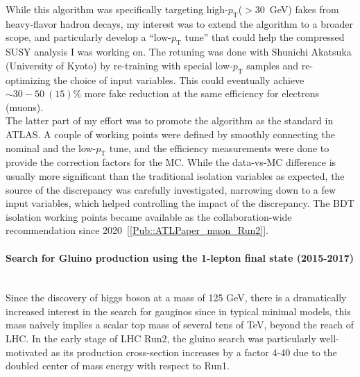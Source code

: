\documentclass[12pt]{article}
\newcommand{\Subsubsection}[1]{\subsubsection*{#1}
\addcontentsline{toc}{subsubsection}{#1}}
\newcommand{\pt}{\ensuremath{p_{\text{T}}}\xspace}
\begin{document}
While this algorithm was specifically targeting high-\pt ($>30$~GeV) fakes from heavy-flavor hadron decays,
my interest was to extend the algorithm to a broader scope, and particularly develop a ``low-\pt tune'' that could help the compressed SUSY analysis I was working on.
The retuning was done with Shunichi Akatsuka (University of Kyoto) by re-training with special low-\pt samples and re-optimizing the choice of input variables.
This could eventually achieve $\sim 30-50~(15)\%$ more fake reduction at the same efficiency for electrons (muons). \\

The latter part of my effort was to promote the algorithm as the standard in ATLAS.
A couple of working points were defined by smoothly connecting the nominal and the low-\pt tune, and the efficiency measurements were done to provide the correction factors for the MC.
While the data-vs-MC difference is usually more significant than the traditional isolation variables as expected, the source of the discrepancy was carefully investigated, narrowing down to a few input variables, which helped controlling the impact of the discrepancy.
The BDT isolation working points became available as the collaboration-wide recommendation since 2020~[\ref{Pub::ATLPaper_muon_Run2}].


\paragraph{Search for Gluino production using the 1-lepton final state (2015-2017)}  \phantom{k} \vspace{3mm} \\
Since the discovery of higgs boson at a mass of 125 GeV, there is a dramatically increased interest in the search for gauginos since in typical minimal models, this mass naively implies a scalar top mass of several tens of TeV, beyond the reach of LHC. In the early stage of LHC Run2, the gluino search was particularly well-motivated as its production cross-section increases by a factor 4-40 due to the doubled center of mass energy with respect to Run1. \\
\end{document}
